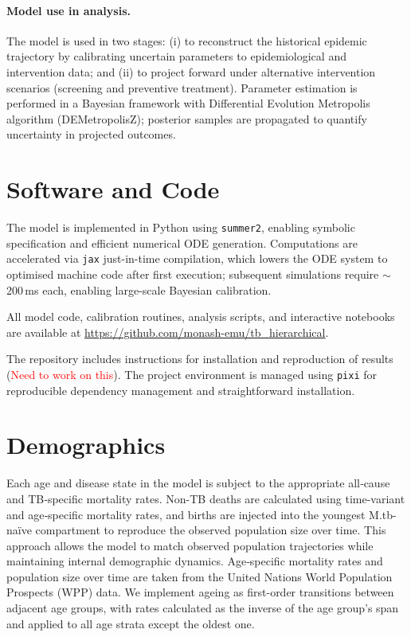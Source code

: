 \documentclass[11pt]{article}
\begin{document}
\paragraph{Model use in analysis.}
The model is used in two stages: (i) to reconstruct the historical epidemic trajectory by calibrating uncertain parameters to epidemiological and intervention data; and (ii) to project forward under alternative intervention scenarios (screening and preventive treatment). Parameter estimation is performed in a Bayesian framework with Differential Evolution Metropolis algorithm (DEMetropolisZ); posterior samples are propagated to quantify uncertainty in projected outcomes.

\section{Software and Code}

The model is implemented in Python using \texttt{summer2}, enabling symbolic specification and efficient numerical ODE generation. Computations are accelerated via \texttt{jax} just-in-time compilation, which lowers the ODE system to optimised machine code after first execution; subsequent simulations require \(\sim\)200\,ms each, enabling large-scale Bayesian calibration.

All model code, calibration routines, analysis scripts, and interactive notebooks are available at \url{https://github.com/monash-emu/tb_hierarchical}.

The repository includes instructions for installation and reproduction of results (\textcolor{red}{Need to work on this}). The project environment is managed using \texttt{pixi} for reproducible dependency management and straightforward installation.

\section{Demographics}
\label{sec:demog}

Each age and disease state in the model is subject to the appropriate all‑cause and TB‑specific mortality rates. Non-TB deaths are calculated using time-variant and age‑specific mortality rates, and births are injected into the youngest M.tb-naïve compartment to reproduce the observed population size over time.
This approach allows the model to match observed population trajectories while maintaining internal demographic dynamics. Age‑specific mortality rates and population size over time are taken from the United Nations World Population Prospects (WPP) data. 
We implement ageing as first-order transitions between adjacent age groups, with rates calculated as the inverse of the age group's span and applied to all age strata except the oldest one.
\end{document}
